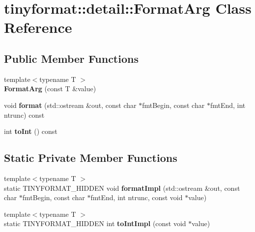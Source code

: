 \hypertarget{classtinyformat_1_1detail_1_1FormatArg}{}\section{tinyformat\+:\+:detail\+:\+:Format\+Arg Class Reference}
\label{classtinyformat_1_1detail_1_1FormatArg}
\subsection*{Public Member Functions}
\begin{DoxyCompactItemize}
\item 
\mbox{\label{classtinyformat_1_1detail_1_1FormatArg_adec80164e93744f53ae7ecc6a5f6af27}} 
{\footnotesize template$<$typename T $>$ }\\{\bfseries Format\+Arg} (const T \&value)
\item 
\mbox{\label{classtinyformat_1_1detail_1_1FormatArg_acbf435711bbe4a4da7fc81758d7108a9}} 
void {\bfseries format} (std\+::ostream \&out, const char $\ast$fmt\+Begin, const char $\ast$fmt\+End, int ntrunc) const
\item 
\mbox{\label{classtinyformat_1_1detail_1_1FormatArg_a91b69f66ce9dc8ca2914dce8985d7a1a}} 
int {\bfseries to\+Int} () const
\end{DoxyCompactItemize}
\subsection*{Static Private Member Functions}
\begin{DoxyCompactItemize}
\item 
\mbox{\label{classtinyformat_1_1detail_1_1FormatArg_a14632665aa1c2ecfbddf35ea23479bfb}} 
{\footnotesize template$<$typename T $>$ }\\static T\+I\+N\+Y\+F\+O\+R\+M\+A\+T\+\_\+\+H\+I\+D\+D\+EN void {\bfseries format\+Impl} (std\+::ostream \&out, const char $\ast$fmt\+Begin, const char $\ast$fmt\+End, int ntrunc, const void $\ast$value)
\item 
\mbox{\label{classtinyformat_1_1detail_1_1FormatArg_a646cd3417730e0a797d37a898bb081be}} 
{\footnotesize template$<$typename T $>$ }\\static T\+I\+N\+Y\+F\+O\+R\+M\+A\+T\+\_\+\+H\+I\+D\+D\+EN int {\bfseries to\+Int\+Impl} (const void $\ast$value)
\end{DoxyCompactItemize}
